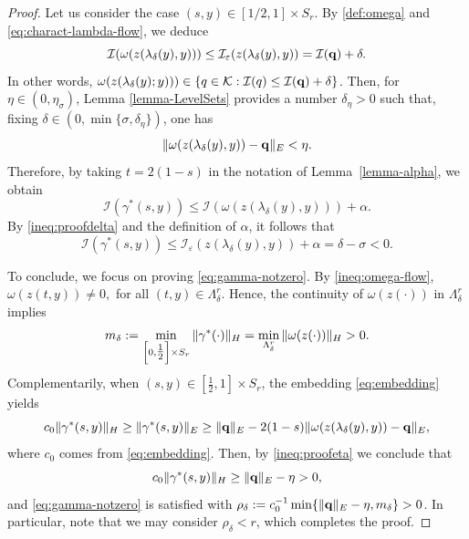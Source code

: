 \documentclass[10pt,a4paper]{amsart}
\newcommand{\Ebanach}{{\textnormal E}}
\newcommand{\Hilb}{{\textnormal H}}
\newcommand{\boI}{\mathcal{I}}
\newcommand{\boK}{\mathcal{K}}
\newcommand{\minq}{{\bf q}}
\begin{document}
\begin{proof}
Let us consider the case $(s,y)\in[1/2,1]\times S_r$. By \eqref{def:omega} and \eqref{eq:charact-lambda-flow}, we deduce
\begin{equation}\label{ineq:proofdelta}
    \boI(\omega(z(\lambda_\delta(y),y)))\leq\boI_\varepsilon(z(\lambda_\delta(y),y))=\boI(\minq)+\delta.
\end{equation}
In other words, $\omega(z(\lambda_\delta(y);y)))\in \{q\in\boK: \boI(q)\leq \boI(\minq)+\delta\}$. Then, for $\eta\in (0,\eta_\sigma)$, Lemma \ref{lemma-LevelSets} provides a number $\delta_\eta>0$ such that, fixing $\delta\in (0,\min\{\sigma,\delta_\eta\})$, one has
\begin{equation}\label{ineq:proofeta}
    \|\omega(z(\lambda_\delta(y),y))-\minq\|_\Ebanach<\eta.
\end{equation}Therefore, by taking $t=2(1-s)$ in the notation of Lemma~\ref{lemma-alpha}, we obtain
\begin{equation}\label{ineq:gamma*-negative}
    \boI(\gamma^*(s,y))\leq\boI(\omega(z(\lambda_\delta(y),y)))+\alpha.
\end{equation}
By \eqref{ineq:proofdelta} and the definition of $\alpha$, it follows that
\begin{equation}\label{ineq:gamma*-negative2}
    \boI(\gamma^*(s,y))\leq\boI_\varepsilon(z(\lambda_\delta(y),y))+\alpha=\delta-\sigma<0.
\end{equation}

To conclude, we focus on proving \eqref{eq:gamma-notzero}. By \eqref{ineq:omega-flow}, $
	\omega(z(t,y))\neq0,$ for all $(t,y)\in\Lambda_\delta^r.$ Hence, the continuity of $\omega(z(\cdot))$ in $\Lambda_\delta^r$ implies
\begin{equation}\label{eq:gamma*-positive1}
    m_\delta:=\min_{\left[0,\tfrac{1}{2}\right]\times S_r
}\|\gamma^*(\cdot)\|_\Hilb= \min_{\Lambda_\delta^r}\|\omega(z(\cdot))\|_\Hilb>0.
\end{equation}
Complementarily, when $(s,y)\in\left[\tfrac{1}{2},1\right]\times S_r$, the embedding \eqref{eq:embedding} yields
\begin{equation}
    c_0\|\gamma^*(s,y)\|_\Hilb\geq\|\gamma^*(s,y)\|_{\textnormal E}\geq\|\minq\|_{\textnormal E}-2(1-s)\|\omega(z(\lambda_\delta(y),y))-\minq\|_{\textnormal E},
\end{equation}
where $c_0$ comes from \eqref{eq:embedding}. Then, by \eqref{ineq:proofeta} we conclude that
\begin{equation}\label{eq:gamma*-positive2}
    c_0\|\gamma^*(s,y)\|_\Hilb\geq\|\minq\|_{\textnormal E}-\eta>0,
\end{equation}
and \eqref{eq:gamma-notzero} is satisfied with $\rho_\delta:=c_0^{-1}\min\{\|\minq\|_{\textnormal E}-\eta,m_\delta\}>0$. In particular, note that we may consider $\rho_\delta<r$, which completes the proof.
\end{proof}
\end{document}
